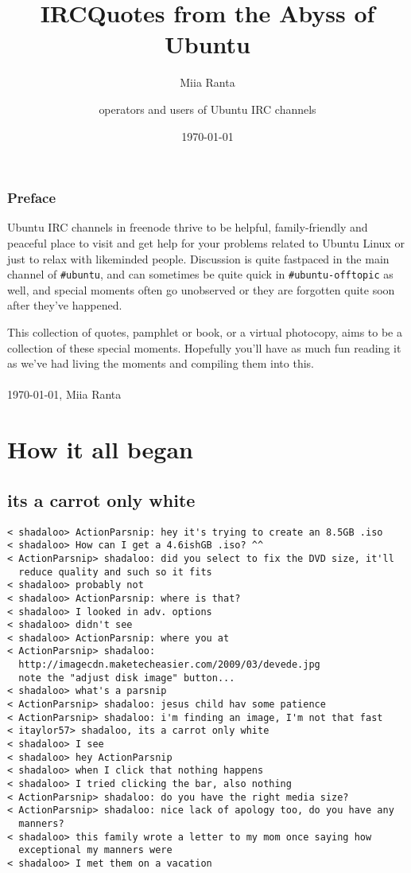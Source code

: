 \documentclass[a4paper]{book}
\title{IRCQuotes from the Abyss of Ubuntu}
\author{Miia Ranta \and operators and users of Ubuntu IRC channels}
\date{\today}
\begin{document}
\maketitle{}
\thispagestyle{empty}
\cleardoublepage{}

\pagestyle{headings}
\setcounter{page}{1}

\subsection*{Preface}

Ubuntu IRC channels in freenode thrive to be helpful, family-friendly 
and peaceful place to visit and get help for your problems related to 
Ubuntu Linux or just to relax with likeminded people. Discussion is quite 
fastpaced in the main channel of \verb$#ubuntu$, and can sometimes be quite 
quick in \verb$#ubuntu-offtopic$ as well, and special moments often go 
unobserved or they are forgotten quite soon after they've happened.

This collection of quotes, pamphlet or book, or a virtual photocopy, 
aims to be a collection of these special moments. Hopefully you'll 
have as much fun reading it as we've had living the moments and 
compiling them into this.
\\
\\
\today, Miia Ranta 
\tableofcontents
\cleardoublepage

\setcounter{page}{1}
\chapter{How it all began}
\section*{its a carrot only white}
\begin{verbatim}
< shadaloo> ActionParsnip: hey it's trying to create an 8.5GB .iso
< shadaloo> How can I get a 4.6ishGB .iso? ^^
< ActionParsnip> shadaloo: did you select to fix the DVD size, it'll 
  reduce quality and such so it fits
< shadaloo> probably not
< shadaloo> ActionParsnip: where is that?
< shadaloo> I looked in adv. options
< shadaloo> didn't see
< shadaloo> ActionParsnip: where you at
< ActionParsnip> shadaloo: 
  http://imagecdn.maketecheasier.com/2009/03/devede.jpg
  note the "adjust disk image" button...
< shadaloo> what's a parsnip
< ActionParsnip> shadaloo: jesus child hav some patience
< ActionParsnip> shadaloo: i'm finding an image, I'm not that fast
< itaylor57> shadaloo, its a carrot only white
< shadaloo> I see
< shadaloo> hey ActionParsnip
< shadaloo> when I click that nothing happens
< shadaloo> I tried clicking the bar, also nothing
< ActionParsnip> shadaloo: do you have the right media size?
< ActionParsnip> shadaloo: nice lack of apology too, do you have any 
  manners?
< shadaloo> this family wrote a letter to my mom once saying how 
  exceptional my manners were
< shadaloo> I met them on a vacation
\end{verbatim}
\end{document}
